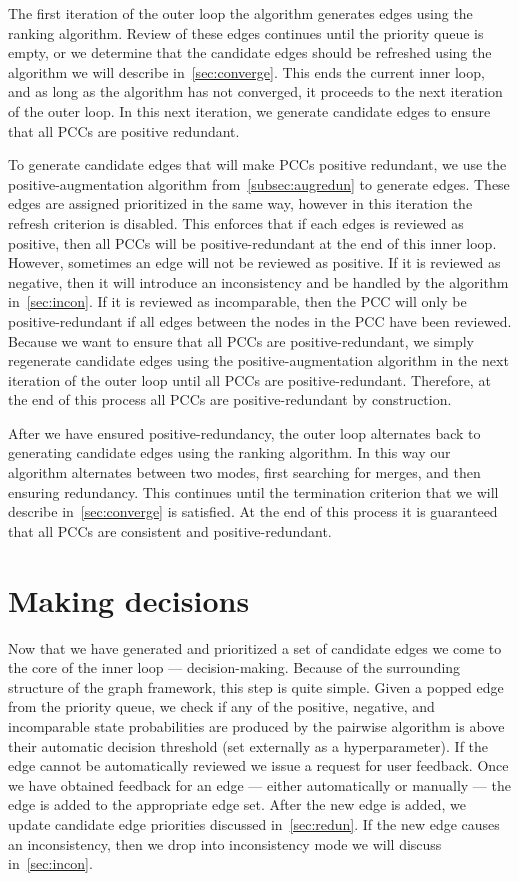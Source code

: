 The first iteration of the outer loop the algorithm generates edges using the ranking algorithm.
Review of these edges continues until the priority queue is empty, or we determine that the candidate edges
  should be refreshed using the algorithm we will describe in~\cref{sec:converge}.
This ends the current inner loop, and as long as the algorithm has not converged, it proceeds to the next
  iteration of the outer loop.
In this next iteration, we generate candidate edges to ensure that all PCCs are positive redundant.

To generate candidate edges that will make PCCs positive redundant, we use the positive-augmentation algorithm
  from~\cref{subsec:augredun} to generate edges.
These edges are assigned prioritized in the same way, however in this iteration the refresh criterion is disabled.
This enforces that if each edges is reviewed as positive, then all PCCs will be positive-redundant at the end of
  this inner loop.
However, sometimes an edge will not be reviewed as positive.
If it is reviewed as negative, then it will introduce an inconsistency and be handled by the algorithm
  in~\cref{sec:incon}.
If it is reviewed as incomparable, then the PCC will only be positive-redundant if all edges between the nodes in
  the PCC have been reviewed.
Because we want to ensure that all PCCs are positive-redundant, we simply regenerate candidate edges using the
  positive-augmentation algorithm in the next iteration of the outer loop until all PCCs are positive-redundant.
Therefore, at the end of this process all PCCs are positive-redundant by construction.

After we have ensured positive-redundancy, the outer loop alternates back to generating candidate edges using the
  ranking algorithm.
In this way our algorithm alternates between two modes, first searching for merges, and then ensuring redundancy.
This continues until the termination criterion that we will describe in~\cref{sec:converge} is satisfied.
At the end of this process it is guaranteed that all PCCs are consistent and positive-redundant.


\section{Making decisions}\label{sec:decision}

Now that we have generated and prioritized a set of candidate edges we come to the core of the inner loop ---
  decision-making.
Because of the surrounding structure of the graph framework, this step is quite simple.
Given a popped edge from the priority queue, we check if any of the positive, negative, and incomparable state
  probabilities are produced by the pairwise algorithm is above their automatic decision threshold (set externally
  as a hyperparameter).
If the edge cannot be automatically reviewed we issue a request for user feedback.
Once we have obtained feedback for an edge --- either automatically or manually --- the edge is added to the
  appropriate edge set.
After the new edge is added, we update candidate edge priorities discussed in~\cref{sec:redun}.
If the new edge causes an inconsistency, then we drop into inconsistency mode we will discuss
  in~\cref{sec:incon}.

